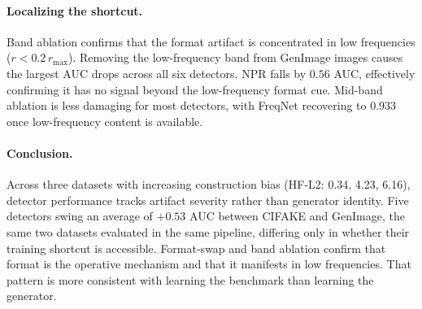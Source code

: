 \documentclass{article}
\begin{document}
\paragraph{Localizing the shortcut.}
Band ablation confirms that the format artifact is concentrated in low frequencies ($r < 0.2\,r_{\max}$).
Removing the low-frequency band from GenImage images causes the largest AUC drops across all six detectors.
NPR falls by $0.56$ AUC, effectively confirming it has no signal beyond the low-frequency format cue.
Mid-band ablation is less damaging for most detectors, with FreqNet recovering to $0.933$ once low-frequency content is available.

\paragraph{Conclusion.}
Across three datasets with increasing construction bias (HF-L2: 0.34, 4.23, 6.16), detector performance tracks artifact severity rather than generator identity.
Five detectors swing an average of $+0.53$ AUC between CIFAKE and GenImage, the same two datasets evaluated in the same pipeline, differing only in whether their training shortcut is accessible.
Format-swap and band ablation confirm that format is the operative mechanism and that it manifests in low frequencies.
That pattern is more consistent with learning the benchmark than learning the generator.




\end{document}
